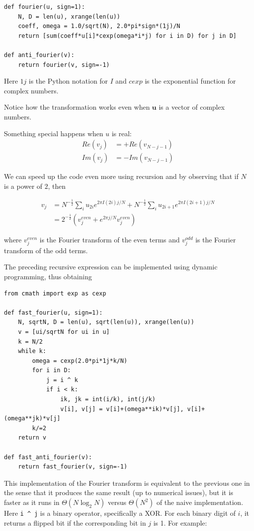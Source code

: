 \documentclass[justified,sixbynine]{tufte-book}
\theoremstyle{plain}%
\theoremstyle{definition}
\theoremstyle{remark}
\begin{document}
\begin{fullwidth}
\begin{lstlisting}
def fourier(u, sign=1):
    N, D = len(u), xrange(len(u))
    coeff, omega = 1.0/sqrt(N), 2.0*pi*sign*(1j)/N
    return [sum(coeff*u[i]*cexp(omega*i*j) for i in D) for j in D]

def anti_fourier(v):
    return fourier(v, sign=-1)
\end{lstlisting}

Here $1j$ is the Python notation for $I$ and $cexp$ is the exponential function for complex numbers.

Notice how the transformation works even when $\mathbf{u}$ is a vector of complex numbers.

Something special happens when $u$ is real:
\begin{align}
Re(v_j) &= +Re(v_{N-j-1}) \\
Im(v_j) &= -Im(v_{N-j-1})
\end{align}

We can speed up the code even more using recursion and by observing that if $N$ is a power of $2$, then

\begin{align}
  v_j &= N^{-\frac12} \sum_i u_{2i} e^{2\pi I (2i)j/N} + N^{-\frac12} \sum_i u_{2i+1} e^{2\pi I (2i+1)j/N} \\
      &= 2^{-\frac12} ( v_j^{even} + e^{2\pi j/N} v_j^{even} )
\end{align}

where $v_j^{even}$ is the Fourier transform of the even terms and $v_j^{odd}$ is the Fourier transform of the odd terms.

The preceding recursive expression can be implemented using dynamic programming, thus obtaining


\begin{lstlisting}
from cmath import exp as cexp

def fast_fourier(u, sign=1):
    N, sqrtN, D = len(u), sqrt(len(u)), xrange(len(u))
    v = [ui/sqrtN for ui in u]
    k = N/2
    while k:
        omega = cexp(2.0*pi*1j*k/N)
        for i in D:
            j = i ^ k
            if i < k:
                ik, jk = int(i/k), int(j/k)
                v[i], v[j] = v[i]+(omega**ik)*v[j], v[i]+(omega**jk)*v[j]
        k/=2
    return v

def fast_anti_fourier(v):
    return fast_fourier(v, sign=-1)
\end{lstlisting}

This implementation of the Fourier transform is equivalent to the previous one in the sense that it produces the same result (up to numerical issues), but it is faster as it runs in $\Theta(N \log_2 N)$ versus $\Theta(N^2)$ of the naive implementation. Here \verb!i ^ j!
is a binary operator, specifically a XOR. For each binary digit of $i$, it returns a flipped bit if the corresponding bit in $j$ is 1. For example:


\end{fullwidth}
\end{document}
